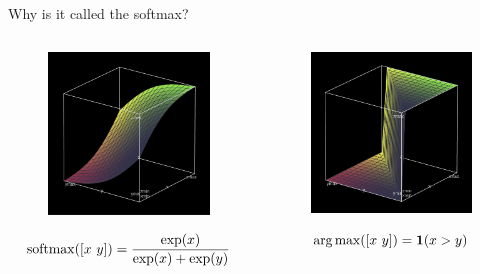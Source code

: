 \documentclass{beamer}
\begin{document}
\begin{frame}{Why is it called the softmax?}

  \begin{columns}[t]
    \begin{column}[t]{0.5\textwidth}


      \begin{figure}
        \centering
        \includegraphics[width=5cm]{softmax}
      \end{figure}
      \[\softmax([x\ y]) = \frac{\exp(x)}{\displaystyle  \exp(x) + \exp(y)}  \]
    \end{column}

    \begin{column}[t]{0.5\textwidth}


      \begin{figure}
        \centering
      \includegraphics[width=5cm]{argmax}
      \end{figure}
      \[\argmax([x\ y]) = \indicator(x > y) \]      
    \end{column}
  \end{columns}
\end{frame}
\end{document}
